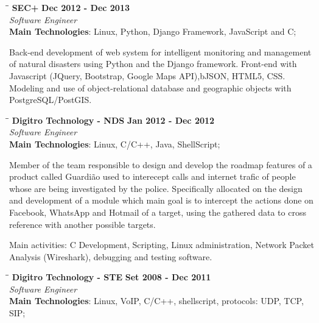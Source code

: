 \documentclass[margin]{res}
\begin{document}
\begin{resume}
\vspace{-0.1in}
   \begin{tabbing}
   \hspace{2.3in}\= \hspace{1.7in}\= \kill %
    \textbf{SEC+}    \>\>\textbf{Dec 2012 - Dec 2013}\\
    \textit{Software Engineer}\\        
    \textbf{Main Technologies}: Linux, Python, Django Framework, JavaScript and C;
   \end{tabbing}\vspace{-20pt}      %
    \vspace{2mm}
     Back-end development of web system for intelligent monitoring and management of natural disasters using Python and the Django framework. Front-end with Javascript (JQuery, Bootstrap, Google Maps API),bJSON, HTML5, CSS. Modeling and use of object-relational database and geographic objects with
     PostgreSQL/PostGIS.

\vspace{-0.1in}
   \begin{tabbing}
   \hspace{2.3in}\= \hspace{1.7in}\= \kill %
    \textbf{Digitro Technology - NDS}    \>\>\textbf{Jan 2012 - Dec 2012}\\
    \textit{Software Engineer}\\   
    \textbf{Main Technologies}: Linux, C/C++, Java, ShellScript;
   \end{tabbing}\vspace{-20pt}      %
    \vspace{2mm}
    Member of the team responsible to design and develop the roadmap features of a product called
    Guardião used to interecept calls and internet trafic of people whose are being investigated by the police. Specifically allocated on the design and development of a module which main goal is to intercept the actions done on Facebook, WhatsApp and Hotmail of a target, using the gathered data to cross reference with another possible targets.

    Main activities: C Development, Scripting, Linux administration, Network Packet Analysis (Wireshark), debugging  and testing software.

\vspace{-0.1in}   
   \begin{tabbing}
   \hspace{2.3in}\= \hspace{1.7in}\= \kill %
    \textbf{Digitro Technology - STE}    \>\>\textbf{Set 2008 - Dec 2011}\\
    \textit{Software Engineer}\\   
    \textbf{Main Technologies}: Linux, VoIP, C/C++, shellscript, protocols: UDP, TCP, SIP;
   \end{tabbing}\vspace{-20pt}      %
    \vspace{2mm}
    

\end{resume}
\end{document}
